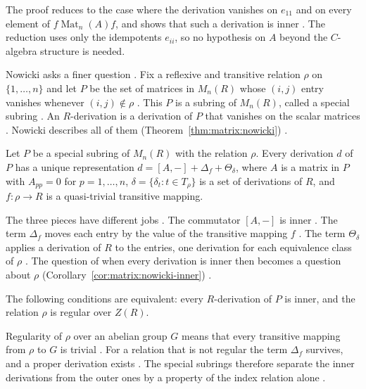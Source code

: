 The proof reduces to the case where the derivation vanishes on $e_{11}$ and on
every element of $f\operatorname{Mat}_n(A)f$, and shows that such a derivation is
inner \cite[p.~209]{Jondrup1995}. The reduction uses only the idempotents
$e_{ii}$, so no hypothesis on $A$ beyond the $C$-algebra structure is needed.

Nowicki asks a finer question \cite[p.~281]{Nowicki1983}. Fix a reflexive and transitive relation $\rho$ on
$\{1,\dots,n\}$ and let $P$ be the set of matrices in $M_n(R)$ whose $(i,j)$
entry vanishes whenever $(i,j)\notin\rho$ \cite[p.~281]{Nowicki1983}. This $P$
is a subring of $M_n(R)$, called a special subring
\cite[p.~281]{Nowicki1983}. An $R$-derivation is a derivation of $P$ that
vanishes on the scalar matrices \cite[p.~284]{Nowicki1983}. Nowicki describes
all of them (Theorem~\ref{thm:matrix:nowicki}) \cite[p.~287]{Nowicki1983}.

\begin{theorem}\label{thm:matrix:nowicki}
Let $P$ be a special subring of $M_n(R)$ with the relation $\rho$. Every
derivation $d$ of $P$ has a unique representation
$d=[A,-]+\Delta_f+\Theta_\delta$, where $A$ is a matrix in $P$ with
$A_{pp}=0$ for $p=1,\dots,n$, $\delta=\{\delta_t\colon t\in T_\rho\}$ is a set of
derivations of $R$, and $f\colon\rho\to R$ is a quasi-trivial transitive
mapping.
\end{theorem}

The three pieces have different jobs \cite[p.~287]{Nowicki1983}. The commutator
$[A,-]$ is inner \cite[p.~287]{Nowicki1983}. The term $\Delta_f$ moves each entry
by the value of the transitive mapping $f$ \cite[p.~287]{Nowicki1983}. The term
$\Theta_\delta$ applies a derivation of $R$ to the entries, one derivation for
each equivalence class of $\rho$ \cite[p.~287]{Nowicki1983}. The question of
when every derivation is inner then becomes a question about $\rho$ (Corollary~\ref{cor:matrix:nowicki-inner})
\cite[p.~289]{Nowicki1983}.\begin{corollary}\label{cor:matrix:nowicki-inner}
The following conditions are equivalent: every $R$-derivation of $P$ is inner,
and the relation $\rho$ is regular over $Z(R)$.
\end{corollary}

Regularity of $\rho$ over an abelian group $G$ means that every transitive
mapping from $\rho$ to $G$ is trivial \cite[Definition~2.2, p.~283]{Nowicki1983}.
For a relation that is not regular the term $\Delta_f$ survives, and a proper
derivation exists \cite[p.~289]{Nowicki1983}. The special subrings therefore
separate the inner derivations from the outer ones by a property of the index
relation alone \cite[p.~289]{Nowicki1983}.

